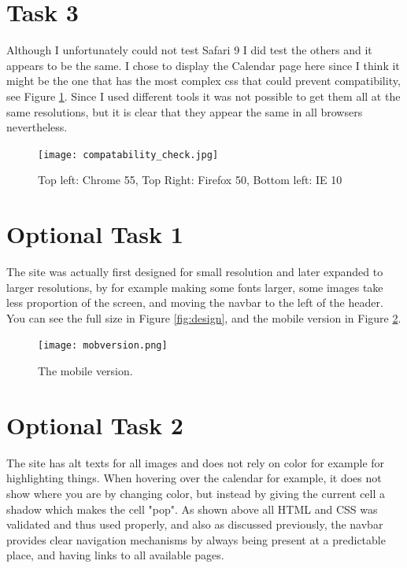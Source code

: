 \documentclass[a4paper]{scrreprt}
\begin{document}
\section{Task 3}

Although I unfortunately could not test Safari 9 I did test the others and it appears to be the same. I chose to display the Calendar page here since I think it might be the one that has the most complex css that could prevent compatibility, see Figure \ref{fig:compcheck}. Since I used different tools it was not possible to get them all at the same resolutions, but it is clear that they appear the same in all browsers nevertheless.

\begin{figure}[h!]
  \begin{center}
    \texttt{[image: compatability\_check.jpg]}
    \caption{Top left: Chrome 55, Top Right: Firefox 50, Bottom left: IE 10}
    \label{fig:compcheck}
  \end{center}
\end{figure}

\section{Optional Task 1}

The site was actually first designed for small resolution and later expanded to larger resolutions, by for example making some fonts larger, some images take less proportion of the screen, and moving the navbar to the left of the header. You can see the full size in Figure \ref{fig:design}, and the mobile version in Figure \ref{fig:mobversion}.

\begin{figure}[h!]
  \begin{center}
    \texttt{[image: mobversion.png]}
    \caption{The mobile version.}
    \label{fig:mobversion}
  \end{center}
\end{figure}

\section{Optional Task 2}

The site has alt texts for all images and does not rely on color for example for highlighting things. When hovering over the calendar for example, it does not show where you are by changing color, but instead by giving the current cell a shadow which makes the cell "pop". As shown above all HTML and CSS was validated and thus used properly, and also as discussed previously, the navbar provides clear navigation mechanisms by always being present at a predictable place, and having links to all available pages.
\end{document}
